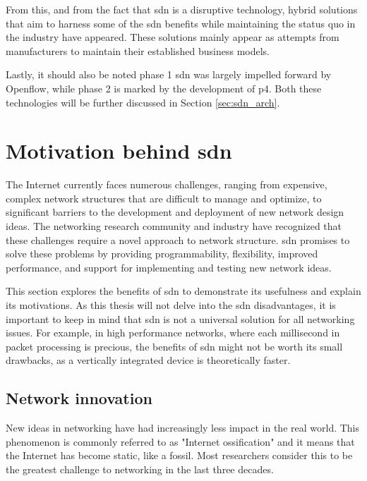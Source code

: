 From this, and from the fact that \gls{sdn} is a disruptive technology, hybrid solutions that aim to harness some of the \gls{sdn} benefits while maintaining the status quo in the industry have appeared\cite{peterson_software-defined_2021}. These solutions mainly appear as attempts from manufacturers to maintain their established business models. 

Lastly, it should also be noted phase 1 \gls{sdn} was largely impelled forward by Openflow, while phase 2 is marked by the development of \gls{p4}. Both these technologies will be further discussed in Section \ref{sec:sdn_arch}.


\section[Motivation behind SDN]{Motivation behind \gls{sdn}}

The Internet currently faces numerous challenges, ranging from expensive, complex network structures that are difficult to manage and optimize, to significant barriers to the development and deployment of new network design ideas. The networking research community and industry have recognized that these challenges require a novel approach to network structure. \gls{sdn} promises to solve these problems by providing programmability, flexibility, improved performance, and support for implementing and testing new network ideas.

This section explores the benefits of \gls{sdn} to demonstrate its usefulness and explain its motivations. As this thesis will not delve into the \gls{sdn} disadvantages, it is important to keep in mind that \gls{sdn} is not a universal solution for all networking issues. For example, in high performance networks, where each millisecond in packet processing is precious, the benefits of \gls{sdn} might not be worth its small drawbacks, as a vertically integrated device is theoretically faster\cite{nunes_survey_2014}. 

\subsection{Network innovation}
New ideas in networking have had increasingly less impact in the real world. This phenomenon is commonly referred to as "Internet ossification" and it means that the Internet has become static, like a fossil\cite{nunes_survey_2014}. Most researchers consider this to be the greatest challenge to networking in the last three decades.

